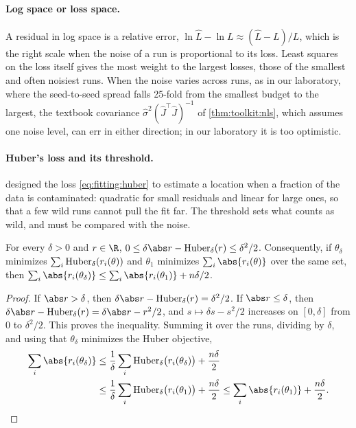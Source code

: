 \begin{refsection}
\paragraph{Log space or loss space.} A residual in log space is a relative error, $\ln\hat L-\ln L\approx(\hat L-L)/L$, which is the right scale when the noise of a run is proportional to its loss. Least squares on the loss itself gives the most weight to the largest losses, those of the smallest and often noisiest runs. When the noise varies across runs, as in our laboratory, where the seed-to-seed spread falls 25-fold from the smallest budget to the largest, the textbook covariance $\hat\sigma^2(\hat J^\top\hat J)^{-1}$ of \cref{thm:toolkit:nls}, which assumes one noise level, can err in either direction; in our laboratory it is too optimistic.

\paragraph{Huber's loss and its threshold.} \Textcite{Huber1964} designed the loss \eqref{eq:fitting:huber} to estimate a location when a fraction of the data is contaminated: quadratic for small residuals and linear for large ones, so that a few wild runs cannot pull the fit far. The threshold sets what counts as wild, and must be compared with the noise.

\begin{lemma}\label{lem:fitting:lad}
For every $\delta>0$ and $r\in\R$, $0\le\delta\abs r-\fittingHuber_\delta(r)\le\delta^2/2$. Consequently, if $\theta_\delta$ minimizes $\sum_i\operatorname{Huber}_\delta(r_i(\theta))$ and $\theta_1$ minimizes $\sum_i\abs{r_i(\theta)}$ over the same set, then $\sum_i\abs{r_i(\theta_\delta)}\le\sum_i\abs{r_i(\theta_1)}+n\delta/2$.
\end{lemma}

\begin{proof}
If $\abs r>\delta$, then $\delta\abs r-\fittingHuber_\delta(r)=\delta^2/2$. If $\abs r\le\delta$, then $\delta\abs r-\fittingHuber_\delta(r)=\delta\abs r-r^2/2$, and $s\mapsto\delta s-s^2/2$ increases on $[0,\delta]$ from $0$ to $\delta^2/2$. This proves the inequality. Summing it over the runs, dividing by $\delta$, and using that $\theta_\delta$ minimizes the Huber objective,
\begin{align*}
\sum_i\abs{r_i(\theta_\delta)}&\le\frac1\delta\sum_i\fittingHuber_\delta\bigl(r_i(\theta_\delta)\bigr)+\frac{n\delta}2\\
&\le\frac1\delta\sum_i\fittingHuber_\delta\bigl(r_i(\theta_1)\bigr)+\frac{n\delta}2\le\sum_i\abs{r_i(\theta_1)}+\frac{n\delta}2.\qedhere
\end{align*}
\end{proof}


\end{refsection}
